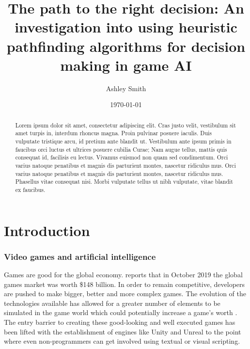 \documentclass[11pt, a4paper]{article}
\begin{document}
\title{\titlefont The path to the right decision: An investigation into using heuristic pathfinding algorithms for decision making in game AI}
\author{Ashley Smith}
\date{\today}
\maketitle
\thispagestyle{empty}

\renewcommand\abstractname{\textbf{Abstract}}
\begin{abstract}
Lorem ipsum dolor sit amet, consectetur adipiscing elit. Cras justo velit, vestibulum sit amet turpis in, interdum rhoncus magna. Proin pulvinar posuere iaculis. Duis vulputate tristique arcu, id pretium ante blandit ut. Vestibulum ante ipsum primis in faucibus orci luctus et ultrices posuere cubilia Curae; Nam augue tellus, mattis quis consequat id, facilisis eu lectus. Vivamus euismod non quam sed condimentum. Orci varius natoque penatibus et magnis dis parturient montes, nascetur ridiculus mus. Orci varius natoque penatibus et magnis dis parturient montes, nascetur ridiculus mus. Phasellus vitae consequat nisi. Morbi vulputate tellus ut nibh vulputate, vitae blandit ex faucibus.
\end{abstract}

\cleardoublepage
\setcounter{page}{1}
\tableofcontents

\cleardoublepage
{}
\setcounter{page}{1}

\section{Introduction}
\label{sec:introduction}

\subsubsection{Video games and artificial intelligence}
\label{subsubsec:videoGamesAndAI}

Games are good for the global economy. \citeauthor{Newzoo} \parencite*{Newzoo} reports that in October 2019 the global games market was worth \$148 billion. In order to remain competitive, developers are pushed to make bigger, better and more complex games. The evolution of the technologies available has allowed for a greater number of elements to be simulated in the game world which could potentially increase a game's worth \parencite{blow2004game}. The entry barrier to creating these good-looking and well executed games has been lifted with the establishment of engines like Unity \parencite{Unity} and Unreal \parencite{Unreal} to the point where even non-programmers can get involved using textual or visual scripting.
\end{document}
